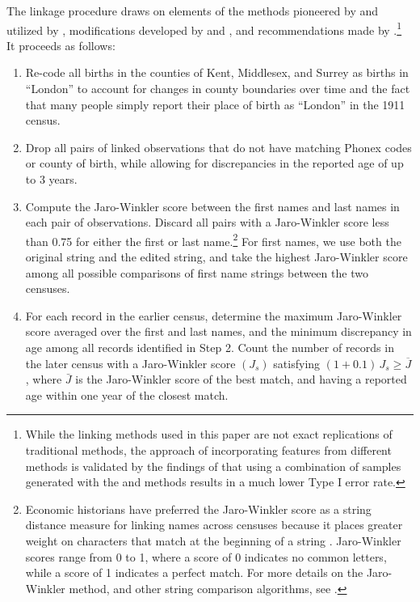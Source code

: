 \documentclass[12pt,english]{article}
\begin{document}
The linkage procedure draws on elements of the methods pioneered by \cite{Ferrie1996} and utilized by \cite{ABE2012}, modifications developed by \cite{Feigenbaum2016} and \cite{MillStein2016}, and recommendations made by \cite{BaileyColeHendersonMassey2020}.\footnote{While the linking methods used in this paper are not exact replications of traditional methods, the approach of incorporating features from different methods is validated by the findings of \cite{BaileyColeHendersonMassey2020} that using a combination of samples generated with the \cite{Ferrie1996} and \cite{Feigenbaum2016} methods results in a much lower Type I error rate.} It proceeds as follows: 

\begin{enumerate}
	\item Re-code all births in the counties of Kent, Middlesex, and Surrey as births in ``London'' to account for changes in county boundaries over time and the fact that many people simply report their place of birth as ``London'' in the 1911 census.
	\item Drop all pairs of linked observations that do not have matching Phonex codes or county of birth, while allowing for discrepancies in the reported age of up to 3 years.
	\item Compute the Jaro-Winkler score between the first names and last names in each pair of observations. Discard all pairs with a Jaro-Winkler score less than 0.75 for either the first or last name.\footnote{Economic historians have preferred the Jaro-Winkler score as a string distance measure for linking names across censuses because it places greater weight on characters that match at the beginning of a string \citep{Feigenbaum2016,MillStein2016}. Jaro-Winkler scores range from 0 to 1, where a score of 0 indicates no common letters, while a score of 1 indicates a perfect match. For more details on the Jaro-Winkler method, and other string comparison algorithms, see \cite{Christen2012}.} For first names, we use both the original string and the edited string, and take the highest Jaro-Winkler score among all possible comparisons of first name strings between the two censuses. 
	\item For each record in the earlier census, determine the maximum Jaro-Winkler score averaged over the first and last names, and the minimum discrepancy in age among all records identified in Step 2. Count the number of records in the later census with a Jaro-Winkler score $(J_{s})$ satisfying $(1+0.1)\,J{}_{s}\geq\overline{J}$, where $\bar{J}$ is the Jaro-Winkler score of the best match, and having a reported age within one year of the closest match. 

\end{enumerate}
\end{document}
